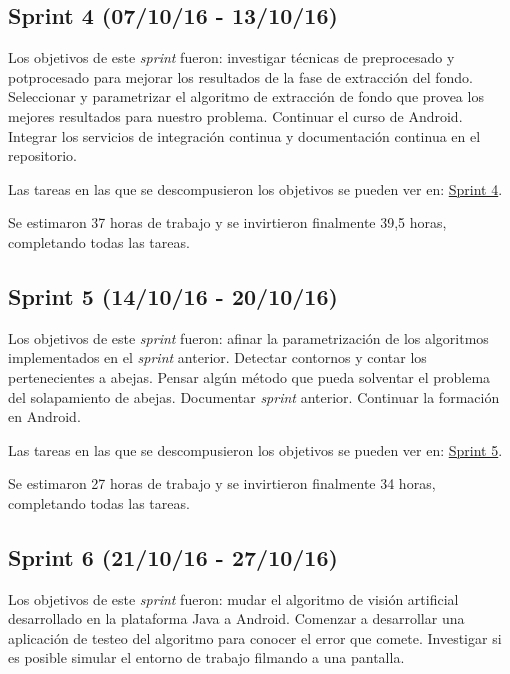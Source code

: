 
\subsection{Sprint 4 (07/10/16 -
13/10/16)}\label{sprint-4-071016---131016}

Los objetivos de este \emph{sprint} fueron: investigar técnicas de
preprocesado y potprocesado para mejorar los resultados de la fase de
extracción del fondo. Seleccionar y parametrizar el algoritmo de
extracción de fondo que provea los mejores resultados para nuestro
problema. Continuar el curso de Android. Integrar los servicios de
integración continua y documentación continua en el repositorio.

Las tareas en las que se descompusieron los objetivos se pueden ver en:
\href{https://github.com/davidmigloz/go-bees/milestone/5?closed=1}{Sprint
4}.

Se estimaron 37 horas de trabajo y se invirtieron finalmente 39,5 horas,
completando todas las tareas.


\subsection{Sprint 5 (14/10/16 -
20/10/16)}\label{sprint-5-141016---201016}

Los objetivos de este \emph{sprint} fueron: afinar la parametrización de
los algoritmos implementados en el \emph{sprint} anterior. Detectar
contornos y contar los pertenecientes a abejas. Pensar algún método que
pueda solventar el problema del solapamiento de abejas. Documentar
\emph{sprint} anterior. Continuar la formación en Android.

Las tareas en las que se descompusieron los objetivos se pueden ver en:
\href{https://github.com/davidmigloz/go-bees/milestone/6?closed=1}{Sprint
5}.

Se estimaron 27 horas de trabajo y se invirtieron finalmente 34 horas,
completando todas las tareas.


\subsection{Sprint 6 (21/10/16 -
27/10/16)}\label{sprint-6-211016---271016}

Los objetivos de este \emph{sprint} fueron: mudar el algoritmo de visión
artificial desarrollado en la plataforma Java a Android. Comenzar a
desarrollar una aplicación de testeo del algoritmo para conocer el error
que comete. Investigar si es posible simular el entorno de trabajo
filmando a una pantalla.

